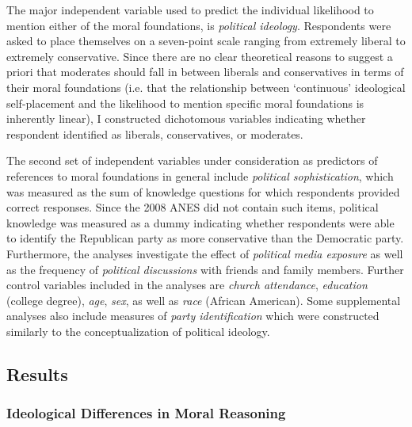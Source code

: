 \documentclass[12pt]{article}
\begin{document}
The major independent variable used to predict the individual likelihood to mention either of the moral foundations, is \textit{political ideology}. Respondents were asked to place themselves on a seven-point scale ranging from extremely liberal to extremely conservative. Since there are no clear theoretical reasons to suggest a priori that moderates should fall in between liberals and conservatives in terms of their moral foundations (i.e. that the relationship between `continuous' ideological self-placement and the likelihood to mention specific moral foundations is inherently linear), I constructed dichotomous variables indicating whether respondent identified as liberals, conservatives, or moderates.

The second set of independent variables under consideration as predictors of references to moral foundations in general include \textit{political sophistication}, which was measured as the sum of knowledge questions for which respondents provided correct responses. Since the 2008 ANES did not contain such items, political knowledge was measured as a dummy indicating whether respondents were able to identify the Republican party as more conservative than the Democratic party. Furthermore, the analyses investigate the effect of \textit{political media exposure} as well as the frequency of \textit{political discussions} with friends and family members. Further control variables included in the analyses are \textit{church attendance}, \textit{education} (college degree), \textit{age}, \textit{sex}, as well as \textit{race} (African American). Some supplemental analyses also include measures of \textit{party identification} which were constructed similarly to the conceptualization of political ideology.


\subsection{Results}

\subsubsection{Ideological Differences in Moral Reasoning}
\end{document}
